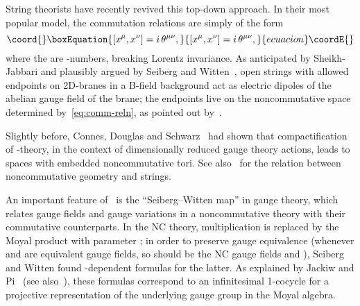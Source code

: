 \documentclass[a4paper,12pt]{article}
\providecommand{\Ahat}{\Hat{A}}
\renewcommand{\Hat}[1]{\widehat{#1}}  %
\providecommand{\1}{\mathbf{1}}         %
\providecommand{\7}{\dagger}            %
\providecommand{\8}{\bullet}            %
\renewcommand{\.}{\cdot}            %
\renewcommand{\:}{\colon}           %
\begin{document}
String theorists have recently revived this top-down approach. In
their most popular model, the commutation relations are simply of the
form
\begin{equation}\coord{}\boxEquation{
[x^\mu, x^\nu] = i\, \theta^{\mu\nu},
\label{eq:comm-reln}
}{
[x^\mu, x^\nu] = i\, \theta^{\mu\nu},
}{ecuacion}\coordE{}\end{equation}
where the \myHighlight{$\theta^{\mu\nu}$}\coordHE{} are \coordHE{}-numbers, breaking Lorentz
invariance. As anticipated by Sheikh-Jabbari \cite{Jabbari} and
plausibly argued by Seiberg and Witten~\cite{SeibergWGeom}, open
strings with allowed endpoints on 2D-branes in a B-field background
act as electric dipoles of the abelian gauge field of the brane; the
endpoints live on the noncommutative space determined
by~\eqref{eq:comm-reln}, as pointed out by~\cite{Schomerus}.

Slightly before, Connes, Douglas and Schwarz~\cite{ConnesDS} had shown
that compactification of \coordHE{}-theory, in the context of dimensionally
reduced gauge theory actions, leads to spaces with embedded
noncommutative tori. See also~\cite{LandiLS} for the relation between
noncommutative geometry and strings.

An important feature of~\cite{SeibergWGeom} is the ``Seiberg--Witten
map'' in gauge theory, which relates gauge fields and gauge variations
in a noncommutative theory with their commutative counterparts. In the
NC theory, multiplication is replaced by the Moyal product
\myHighlight{$\star_\theta$}\coordHE{} with parameter \myHighlight{$\theta = [\theta^{\mu\nu}]$}\coordHE{}; in order
to preserve gauge equivalence (whenever \coordHE{} and \coordHE{} are equivalent
gauge fields, so should be the NC gauge fields \myHighlight{$\Ahat$}\coordHE{} and \myHighlight{$\Ahat'$}\coordHE{}),
Seiberg and Witten found \myHighlight{$\theta$}\coordHE{}-dependent formulas for the latter.
As explained by Jackiw and Pi~\cite{JackiwP} (see
also~\cite{JurcoSW}), these formulas correspond to an infinitesimal
1-cocycle for a projective representation of the underlying gauge
group in the Moyal algebra.
\end{document}
